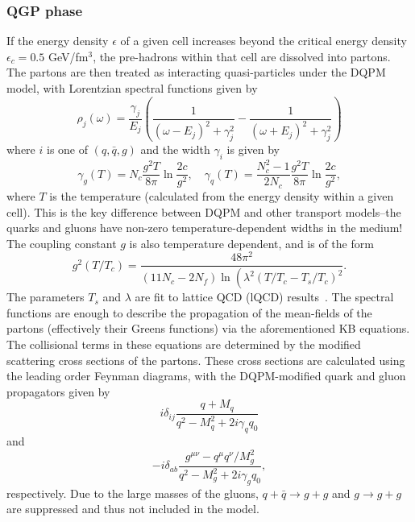 \subsubsection{QGP phase}
If the energy density $\epsilon$ of a given cell increases beyond the critical energy density $\epsilon_c = 0.5$ GeV/fm$^3$, the pre-hadrons within that cell are dissolved into partons. The partons are then treated as interacting quasi-particles under the DQPM~\cite{DQPM} model, with Lorentzian spectral functions given by
\begin{equation}
\rho_j(\omega)=\frac{\gamma_j}{E_j}\left(\frac{1}{\left(\omega-E_j\right)^2+\gamma_j^2}-\frac{1}{\left(\omega+E_j\right)^2+\gamma_j^2}\right)
\end{equation}
where $i$ is one of $(q, \bar{q}, g)$ and the width $\gamma_i$ is given by
\begin{equation}
\gamma_g(T)=N_c \frac{g^2 T}{8 \pi} \ln \frac{2 c}{g^2}, \quad \gamma_q(T)=\frac{N_c^2-1}{2 N_c} \frac{g^2 T}{8 \pi} \ln \frac{2 c}{g^2},
\end{equation}
where $T$ is the temperature (calculated from the energy density within a given cell). This is the key difference between DQPM and other transport models--the quarks and gluons have non-zero temperature-dependent widths in the medium! The coupling constant $g$ is also temperature dependent, and is of the form
\begin{equation}
    g^2\left(T / T_c\right)=\frac{48 \pi^2}{\left(11 N_c-2 N_f\right) \ln \left(\lambda^2\left(T / T_c-T_s / T_c\right)^2\right.}.
\end{equation}
The parameters $T_s$ and $\lambda$ are fit to lattice QCD (lQCD) results~\cite{PHSD2}. The spectral functions are enough to describe the propagation of the mean-fields of the partons (effectively their Greens functions) via the aforementioned KB equations. The collisional terms in these equations are determined by the modified scattering cross sections of the partons. These cross sections are calculated using the leading order Feynman diagrams, with the DQPM-modified quark and gluon propagators given by
\begin{equation}
    i \delta_{i j} \frac{q+M_q}{q^2-M_q^2+2 i \gamma_q q_0}
\end{equation}
and
\begin{equation}
    -i \delta_{a b} \frac{g^{\mu \nu}-q^\mu q^\nu / M_g^2}{q^2-M_g^2+2 i \gamma_g q_0},
\end{equation}
respectively. Due to the large masses of the gluons, $q + \bar{q} \rightarrow g + g$ and $g \rightarrow g + g$ are suppressed and thus not included in the model.

